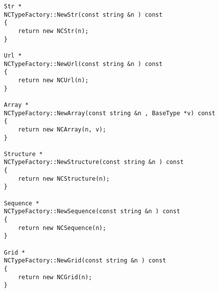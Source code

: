 \documentclass[justify]{dods-paper}
\begin{document}
\begin{lstlisting}[caption={NCTypefactory.cc}]
Str *
NCTypeFactory::NewStr(const string &n ) const 
{ 
    return new NCStr(n);
}

Url *
NCTypeFactory::NewUrl(const string &n ) const 
{ 
    return new NCUrl(n);
}

Array *
NCTypeFactory::NewArray(const string &n , BaseType *v) const 
{ 
    return new NCArray(n, v);
}

Structure *
NCTypeFactory::NewStructure(const string &n ) const 
{ 
    return new NCStructure(n);
}

Sequence *
NCTypeFactory::NewSequence(const string &n ) const 
{ 
    return new NCSequence(n);
}

Grid *
NCTypeFactory::NewGrid(const string &n ) const 
{ 
    return new NCGrid(n);
}
\end{lstlisting}

\bigskip


\T{}
\T\raggedright

\end{document}
